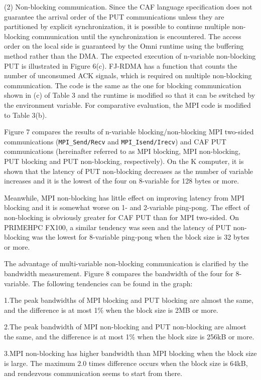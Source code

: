 (2) Non-blocking communication. Since the CAF language specification does 
not guarantee the arrival order of the PUT communications unless they are 
partitioned by explicit synchronization, it is possible to continue multiple 
non-blocking communication until the synchronization is encountered. The access 
order on the local side is guaranteed by the Omni runtime using the buffering 
method rather than the DMA. The expected execution of n-variable non-blocking 
PUT is illustrated in Figure 6(c). FJ-RDMA has a function that counts the 
number of unconsumed ACK signals, which is required on multiple non-blocking 
communication. The code is the same as the one for blocking communication 
shown in (c) of Table 3 and the runtime is modified so that it can be switched 
by the environment variable. For comparative evaluation, the MPI code is modified 
to Table 3(b).

Figure 7 compares the results of n-variable blocking/non-blocking MPI two-sided 
communications ({\tt MPI\_Send/Recv} and {\tt MPI\_Isend/Irecv}) and CAF PUT 
communications (hereinafter referred to as MPI blocking, MPI non-blocking, 
PUT blocking and PUT non-blocking, respectively). On the K computer, it is 
shown that the latency of PUT non-blocking decreases as the number of variable 
increases and it is the lowest of the four on 8-variable for 128 bytes or more. 

Meanwhile, MPI non-blocking has little effect on improving latency from MPI 
blocking and it is somewhat worse on 1- and 2-variable ping-pong. The effect 
of non-blocking is obviously greater for CAF PUT than for MPI two-sided. On 
PRIMEHPC FX100, a similar tendency was seen and the latency of PUT non-blocking 
was the lowest for 8-variable ping-pong when the block size is 32 bytes or more.

The advantage of multi-variable non-blocking communication is clarified by 
the bandwidth measurement. Figure 8 compares the bandwidth of the four for 
8-variable. The following tendencies can be found in the graph:

1.The peak bandwidths of MPI blocking and PUT blocking are almost the same, 
and the difference is at most 1\% when the block size is 2MB or more.

2.The peak bandwidth of MPI non-blocking and PUT non-blocking are almost the 
same, and the difference is at most 1\% when the block size is 256kB or more.

3.MPI non-blocking has higher bandwidth than MPI blocking when the block size 
is large. The maximum 2.0 times difference occurs when the block size is 64kB, and rendezvous communication seems to start from there.

